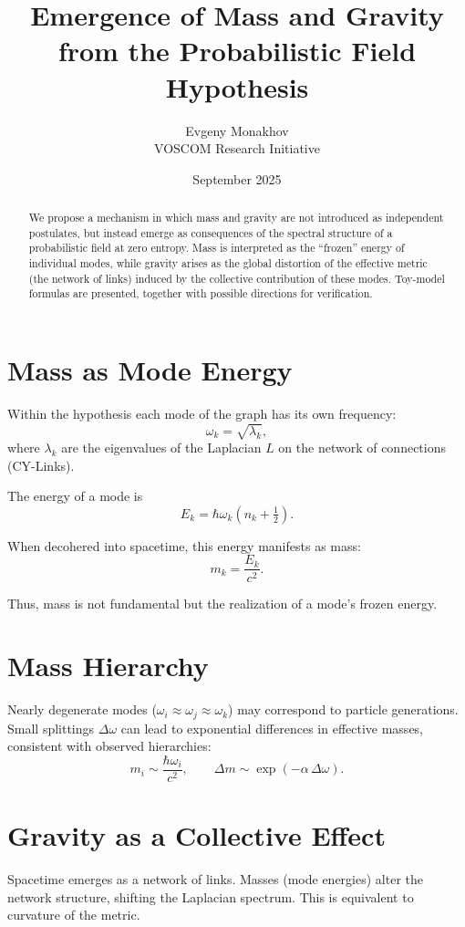 \documentclass[12pt,a4paper]{article}
\title{Emergence of Mass and Gravity \\
from the Probabilistic Field Hypothesis}
\author{Evgeny Monakhov \\ VOSCOM Research Initiative}
\date{September 2025}
\begin{document}
\maketitle

\begin{abstract}
We propose a mechanism in which mass and gravity are not introduced as independent postulates, but instead emerge as consequences of the spectral structure of a probabilistic field at zero entropy. Mass is interpreted as the ``frozen'' energy of individual modes, while gravity arises as the global distortion of the effective metric (the network of links) induced by the collective contribution of these modes. Toy-model formulas are presented, together with possible directions for verification.
\end{abstract}

\section{Mass as Mode Energy}
Within the hypothesis each mode of the graph has its own frequency:
\[
\omega_k = \sqrt{\lambda_k},
\]
where $\lambda_k$ are the eigenvalues of the Laplacian $L$ on the network of connections (CY-Links).

The energy of a mode is
\[
E_k = \hbar \omega_k \left(n_k + \tfrac{1}{2}\right).
\]

When decohered into spacetime, this energy manifests as mass:
\[
m_k = \frac{E_k}{c^2}.
\]

Thus, mass is not fundamental but the realization of a mode's frozen energy.

\section{Mass Hierarchy}
Nearly degenerate modes ($\omega_i \approx \omega_j \approx \omega_k$) may correspond to particle generations. Small splittings $\Delta\omega$ can lead to exponential differences in effective masses, consistent with observed hierarchies:
\[
m_i \sim \frac{\hbar \omega_i}{c^2}, 
\qquad
\Delta m \sim \exp(-\alpha \, \Delta \omega).
\]

\section{Gravity as a Collective Effect}
Spacetime emerges as a network of links. Masses (mode energies) alter the network structure, shifting the Laplacian spectrum. This is equivalent to curvature of the metric.
\end{document}
